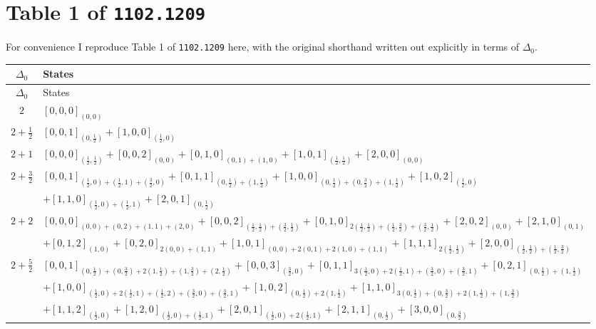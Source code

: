 \documentclass[12pt]{article}
\newcommand{\D}{\ensuremath{\Delta}}
\begin{document}
\section{Table 1 of \texttt{1102.1209}}
\label{app:table1}

For convenience I reproduce Table 1 of \texttt{1102.1209} here, with the original
shorthand written out explicitly in terms of $\Delta_0$.

\footnotesize
\begin{longtable}{|c|p{}|}
\hline
$\D_0$ & States \\
\hline
\endfirsthead
\hline
$\D_0$ & States \\
\hline
\endhead
$2$ & $[0,0,0]_{(0,0)}$ \\
\hline
$2+\frac{1}{2}$ & $[0,0,1]_{(0,\frac{1}{2})}+[1,0,0]_{(\frac{1}{2},0)}$ \\
\hline
$2+1$ & $[0,0,0]_{(\frac{1}{2},\frac{1}{2})}+[0,0,2]_{(0,0)}+[0,1,0]_{(0,1)+(1,0)}+[1,0,1]_{(\frac{1}{2},\frac{1}{2})}+[2,0,0]_{(0,0)}$ \\
\hline
$2+\frac{3}{2}$ & $[0,0,1]_{(\frac{1}{2},0)+(\frac{1}{2},1)+(\frac{3}{2},0)}+[0,1,1]_{(0,\frac{1}{2})+(1,\frac{1}{2})}+[1,0,0]_{(0,\frac{1}{2})+(0,\frac{3}{2})+(1,\frac{1}{2})}+[1,0,2]_{(\frac{1}{2},0)}$ \\
& $+[1,1,0]_{(\frac{1}{2},0)+(\frac{1}{2},1)}+[2,0,1]_{(0,\frac{1}{2})}$ \\
\hline
$2+2$ & $[0,0,0]_{(0,0)+(0,2)+(1,1)+(2,0)}+[0,0,2]_{(\frac{1}{2},\frac{1}{2})+(\frac{3}{2},\frac{1}{2})}+[0,1,0]_{2(\frac{1}{2},\frac{1}{2})+(\frac{1}{2},\frac{3}{2})+(\frac{3}{2},\frac{1}{2})}+[2,0,2]_{(0,0)}+[2,1,0]_{(0,1)}$ \\
& $+[0,1,2]_{(1,0)}+[0,2,0]_{2(0,0)+(1,1)}+[1,0,1]_{(0,0)+2(0,1)+2(1,0)+(1,1)}+[1,1,1]_{2(\frac{1}{2},\frac{1}{2})}+[2,0,0]_{(\frac{1}{2},\frac{1}{2})+(\frac{1}{2},\frac{3}{2})}$ \\
\hline
$2+\frac{5}{2}$ & $[0,0,1]_{(0,\frac{1}{2})+(0,\frac{3}{2})+2(1,\frac{1}{2})+(1,\frac{3}{2})+(2,\frac{1}{2})}+[0,0,3]_{(\frac{3}{2},0)}+[0,1,1]_{3(\frac{1}{2},0)+2(\frac{1}{2},1)+(\frac{3}{2},0)+(\frac{3}{2},1)}+[0,2,1]_{(0,\frac{1}{2})+(1,\frac{1}{2})}$ \\
& $+[1,0,0]_{(\frac{1}{2},0)+2(\frac{1}{2},1)+(\frac{1}{2},2)+(\frac{3}{2},0)+(\frac{3}{2},1)}+[1,0,2]_{(0,\frac{1}{2})+2(1,\frac{1}{2})}+[1,1,0]_{3(0,\frac{1}{2})+(0,\frac{3}{2})+2(1,\frac{1}{2})+(1,\frac{3}{2})}$ \\
& $+[1,1,2]_{(\frac{1}{2},0)}+[1,2,0]_{(\frac{1}{2},0)+(\frac{1}{2},1)}+[2,0,1]_{(\frac{1}{2},0)+2(\frac{1}{2},1)}+[2,1,1]_{(0,\frac{1}{2})}+[3,0,0]_{(0,\frac{3}{2})}$ \\

\end{longtable}
\end{document}
